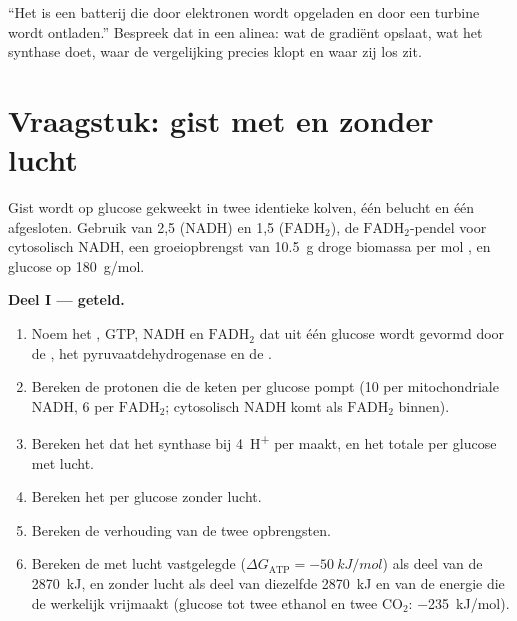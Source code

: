 \begin{exercise}[$\star\star\star$]\label{exo:b1:respiration-fermentation:12}
``Het  is een batterij die door elektronen wordt opgeladen en door een
turbine wordt ontladen.'' Bespreek dat in een alinea: wat de gradiënt opslaat, wat
het synthase doet, waar de vergelijking precies klopt en waar zij los zit.
\end{exercise}

\section{Vraagstuk: gist met en zonder lucht}

\begin{problem}
\label{pb:b1:respiration-fermentation:1}
Gist wordt op glucose gekweekt in twee identieke kolven, één belucht en één
afgesloten. Gebruik  van 2,5 (NADH) en 1,5 ($\mathrm{FADH_2}$), de
$\mathrm{FADH_2}$-pendel voor cytosolisch NADH, een groeiopbrengst van
\qty{10.5}{g} droge biomassa per mol , en glucose op \qty{180}{g/mol}.

\medskip
\noindent\textbf{Deel I ---  geteld.}
\begin{enumerate}
  \item Noem het , GTP, NADH en $\mathrm{FADH_2}$ dat uit één glucose
        wordt gevormd door de , het pyruvaatdehydrogenase en de
        .
  \item Bereken de protonen die de keten per glucose pompt (10 per
        mitochondriale NADH, 6 per $\mathrm{FADH_2}$; cytosolisch NADH komt
        als $\mathrm{FADH_2}$ binnen).
  \item Bereken het  dat het synthase bij \qty{4}{H^+} per  maakt, en
        het totale  per glucose met lucht.
  \item Bereken het  per glucose zonder lucht.
  \item Bereken de verhouding van de twee opbrengsten.
  \item Bereken de met lucht vastgelegde  ($\Delta G_{\text{ATP}}
        = \qty{-50}{kJ/mol}$) als deel van de \qty{2870}{kJ}, en zonder
        lucht als deel van diezelfde \qty{2870}{kJ} en van de energie die
        de  werkelijk vrijmaakt (glucose tot twee ethanol en twee
        $\mathrm{CO_2}$: \qty{-235}{kJ/mol}).
\end{enumerate}


\end{problem}
